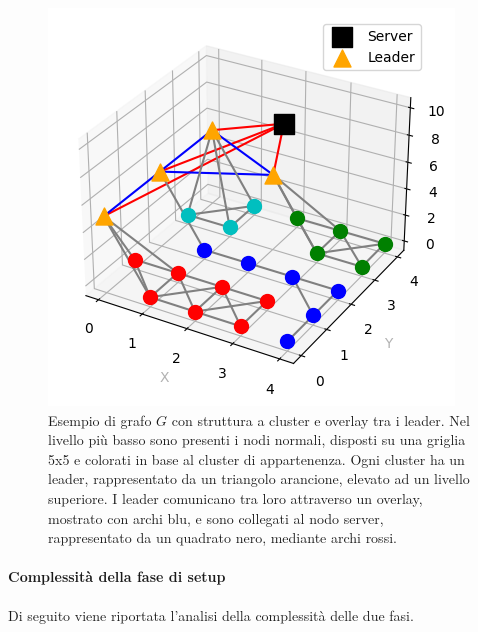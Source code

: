 \documentclass[12pt, a4paper]{report}
\begin{document}
\begin{figure}
    \centering
    \includegraphics[width=0.5\linewidth]{images/setup/Esempio_Grafo_G.png}
    \caption{Esempio di grafo $G$ con struttura a cluster e overlay tra i leader. Nel livello pi\`u basso sono presenti i nodi normali, disposti su una griglia 5x5 e colorati in base al cluster di appartenenza. Ogni cluster ha un leader, rappresentato da un triangolo arancione, elevato ad un livello superiore. I leader comunicano tra loro attraverso un overlay, mostrato con archi blu, e sono collegati al nodo server, rappresentato da un quadrato nero, mediante archi rossi.}
    \label{fig:enter-label}
\end{figure}

\paragraph{Complessit\`a della fase di setup}

Di seguito viene riportata l'analisi della complessit\`a delle due fasi.
\end{document}
